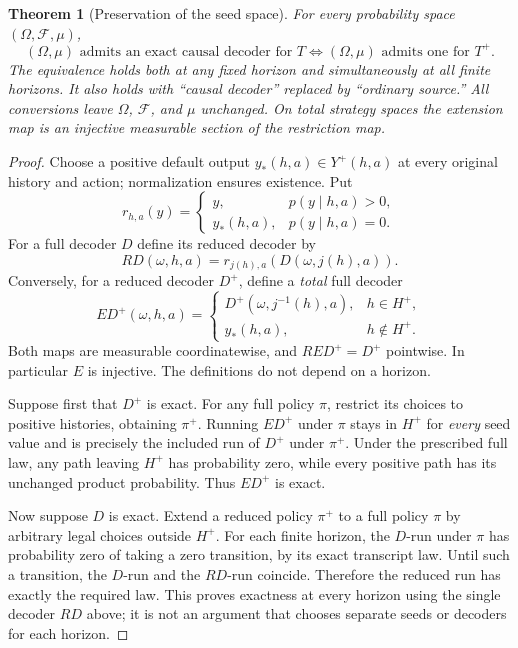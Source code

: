 \documentclass[11pt,a4paper]{article}
\newtheorem{theorem}{Theorem}
\begin{document}
\begin{theorem}[Preservation of the seed space]\label{thm:seed}
For every probability space $(\Omega,\mathcal F,\mu)$,
\[
 \boxed{\quad
 (\Omega,\mu)\text{ admits an exact causal decoder for }T
 \iff
 (\Omega,\mu)\text{ admits one for }T^+ .\quad}
\]
The equivalence holds both at any fixed horizon and simultaneously at
all finite horizons. It also holds with ``causal decoder'' replaced by
``ordinary source.'' All conversions leave $\Omega$, $\mathcal F$, and
$\mu$ unchanged. On total strategy spaces the extension map is an
injective measurable section of the restriction map.
\end{theorem}

\begin{proof}
Choose a positive default output $y_*(h,a)\in Y^+(h,a)$ at every original
history and action; normalization ensures existence. Put
\[
 r_{h,a}(y)=
 \begin{cases}y,&p(y\mid h,a)>0,\\y_*(h,a),&p(y\mid h,a)=0.\end{cases}
\]
For a full decoder $D$ define its reduced decoder by
\[
 RD(\omega,h,a)=r_{j(h),a}(D(\omega,j(h),a)).
\]
Conversely, for a reduced decoder $D^+$, define a \emph{total} full decoder
\[
 ED^+(\omega,h,a)=
 \begin{cases}
 D^+(\omega,j^{-1}(h),a),&h\in H^+,\\
 y_*(h,a),&h\notin H^+.
 \end{cases}
\]
Both maps are measurable coordinatewise, and $RED^+=D^+$ pointwise.
In particular $E$ is injective. The definitions do not depend on a horizon.

Suppose first that $D^+$ is exact. For any full policy $\pi$, restrict
its choices to positive histories, obtaining $\pi^+$. Running $ED^+$
under $\pi$ stays in $H^+$ for \emph{every} seed value and is precisely
the included run of $D^+$ under $\pi^+$. Under the prescribed full law,
any path leaving $H^+$ has probability zero, while every positive path
has its unchanged product probability. Thus $ED^+$ is exact.

Now suppose $D$ is exact. Extend a reduced policy $\pi^+$ to a full
policy $\pi$ by arbitrary legal choices outside $H^+$. For each finite
horizon, the $D$-run under $\pi$ has probability zero of taking a zero
transition, by its exact transcript law. Until such a transition, the
$D$-run and the $RD$-run coincide. Therefore the reduced run has exactly
the required law. This proves exactness at every horizon using the
single decoder $RD$ above; it is not an argument that chooses separate
seeds or decoders for each horizon.


\end{proof}
\end{document}
